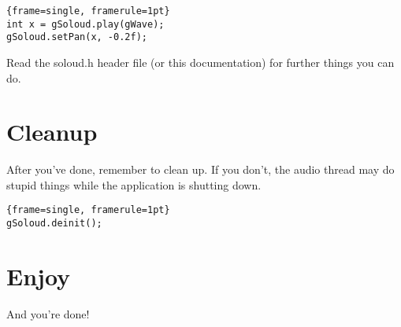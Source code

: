 \begin{lstlisting}{frame=single, framerule=1pt}
int x = gSoloud.play(gWave);
gSoloud.setPan(x, -0.2f);
\end{lstlisting}

Read the soloud.h header file (or this documentation) for further things you can do.

\section{Cleanup}

After you've done, remember to clean up. If you don't, the audio thread may do stupid things while the application is shutting down.

\begin{lstlisting}{frame=single, framerule=1pt}
gSoloud.deinit();
\end{lstlisting}

\section{Enjoy}

And you're done!